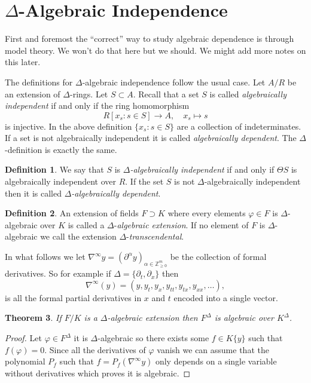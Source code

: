 \documentclass[12pt]{book}
\numberwithin{equation}{section}
\newtheorem{theorem}{Theorem}[subsection]
\theoremstyle{definition}
\newtheorem{definition}[theorem]{Definition}
\theoremstyle{remark}
\newcommand{\ZZ}{\mathbb{Z}}
\begin{document}
\section{$\Delta$-Algebraic Independence}
First and foremost the ``correct'' way to study algebraic dependence is through model theory. 
We won't do that here but we should. 
We might add more notes on this later.

The definitions for $\Delta$-algebraic independence follow the usual case.
Let $A/R$ be an extension of $\Delta$-rings. 
Let $S \subset A$. 
Recall that a set $S$ is called \emph{algebraically independent} if and only if the ring homomorphism
$$ R[x_s \colon s\in S] \to A, \quad x_s \mapsto s $$ 
is injective. 
In the above definition $\lbrace x_s \colon s\in S\rbrace$ are a collection of indeterminates. 
If a set is not algebraically independent it is called \emph{algebraically dependent}.
The $\Delta$-definition is exactly the same. 
\begin{definition}
	We say that $S$ is \emph{$\Delta$-algebraically independent} if and only if $\Theta S$ is algebraically independent over $R$.
	If the set $S$ is not $\Delta$-algebraically independent then it is called \emph{$\Delta$-algebraically dependent}.
\end{definition}

\begin{definition}
	An extension of fields $F\supset K$ where every elements $\varphi \in F$ is $\Delta$-algebraic over $K$ is called a $\Delta$-\emph{algebraic extension}.  
	If no element of $F$ is $\Delta$-algebraic we call the extension $\Delta$-\emph{transcendental}.
\end{definition}

In what follows we let $\nabla^{\infty} y = (\partial^{\alpha} y)_{\alpha \in \ZZ_{\geq0}^{m}}$ be the collection of formal derivatives. 
So for example if $\Delta = \lbrace \partial_t, \partial_x\rbrace$ then 
$$ \nabla^{\infty}(y) = (y,y_t,y_x,y_{tt},y_{tx},y_{xx}, \ldots),$$
is all the formal partial derivatives in $x$ and $t$ encoded into a single vector.
\begin{theorem}
	If $F/K$ is a $\Delta$-algebraic extension then $F^{\Delta}$ is algebraic over $K^{\Delta}$. 
\end{theorem}
\begin{proof}
	Let $\varphi \in F^{\Delta}$ it is $\Delta$-algebraic so there exists some $f \in K\lbrace y \rbrace$ such that $f(\varphi)=0$. 
	Since all the derivatives of $\varphi$ vanish we can assume that the polynomial $P_f$ such that $f = P_f(\nabla^{\infty}y)$ only depends on a single variable without derivatives which proves it is algebraic. 
\end{proof}
\end{document}
